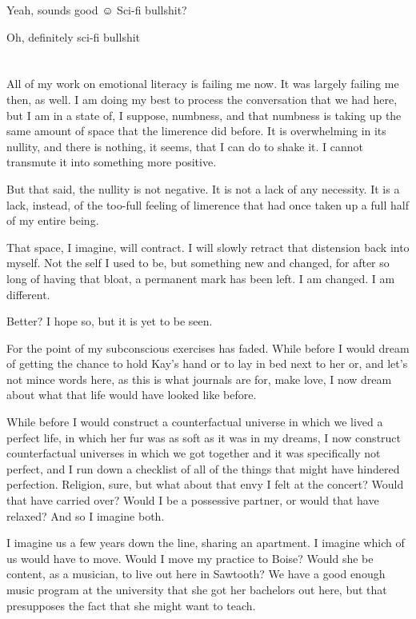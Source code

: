  Yeah, sounds good ☺ Sci-fi bullshit?

 Oh, definitely sci-fi bullshit

\section{}

All of my work on emotional literacy is failing me now. It was largely failing me then, as well. I am doing my best to process the conversation that we had here, but I am in a state of, I suppose, numbness, and that numbness is taking up the same amount of space that the limerence did before. It is overwhelming in its nullity, and there is nothing, it seems, that I can do to shake it. I cannot transmute it into something more positive.

But that said, the nullity is not negative. It is not a lack of any necessity. It is a lack, instead, of the too-full feeling of limerence that had once taken up a full half of my entire being.

That space, I imagine, will contract. I will slowly retract that distension back into myself. Not the self I used to be, but something new and changed, for after so long of having that bloat, a permanent mark has been left. I am changed. I am different.

Better? I hope so, but it is yet to be seen.

For the point of my subconscious exercises has faded. While before I would dream of getting the chance to hold Kay's hand or to lay in bed next to her or, and let's not mince words here, as this is what journals are for, make love, I now dream about what that life would have looked like before.

While before I would construct a counterfactual universe in which we lived a perfect life, in which her fur was as soft as it was in my dreams, I now construct counterfactual universes in which we got together and it was specifically not perfect, and I run down a checklist of all of the things that might have hindered perfection. Religion, sure, but what about that envy I felt at the concert? Would that have carried over? Would I be a possessive partner, or would that have relaxed? And so I imagine both.

I imagine us a few years down the line, sharing an apartment. I imagine which of us would have to move. Would I move my practice to Boise? Would she be content, as a musician, to live out here in Sawtooth? We have a good enough music program at the university that she got her bachelors out here, but that presupposes the fact that she might want to teach.


